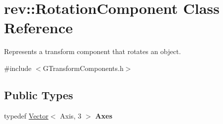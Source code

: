 \hypertarget{classrev_1_1_rotation_component}{}\section{rev\+::Rotation\+Component Class Reference}
\label{classrev_1_1_rotation_component}


Represents a transform component that rotates an object.  




{\ttfamily \#include $<$G\+Transform\+Components.\+h$>$}

\subsection*{Public Types}
\begin{DoxyCompactItemize}
\item 
\mbox{\label{classrev_1_1_rotation_component_a69a67934cd0a27b0b5d552526fbb8e89}} 
typedef \mbox{\hyperlink{classrev_1_1_vector}{Vector}}$<$ Axis, 3 $>$ {\bfseries Axes}
\end{DoxyCompactItemize}
